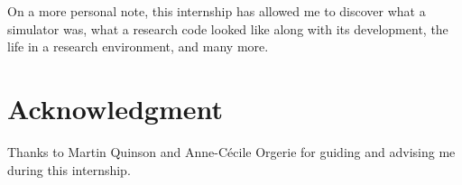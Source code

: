 \documentclass[a4paper, onecolumn]{article}
\begin{document}
On a more personal note, this internship has allowed me to discover what a 
simulator was, what a research code looked like along with its development, the 
life in a research environment, and many more.


\section*{Acknowledgment}
Thanks to Martin Quinson and Anne-C\'ecile Orgerie for guiding and advising me 
during this internship.




\end{document}
